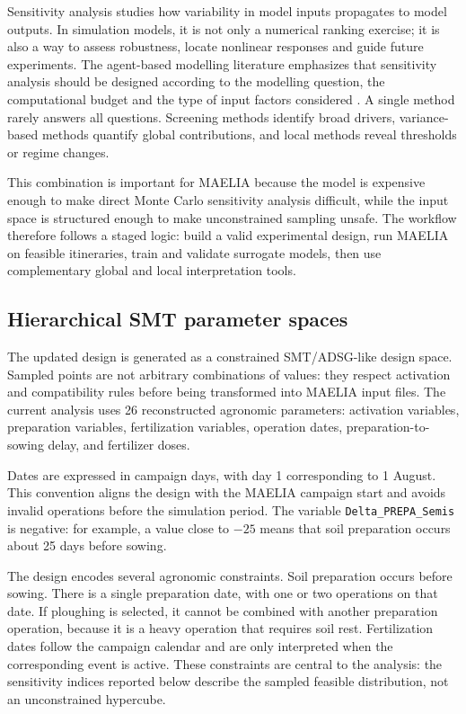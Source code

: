 \documentclass[11pt,a4paper]{article}
\newcommand{\param}[1]{\texttt{#1}}
\begin{document}
Sensitivity analysis studies how variability in model inputs propagates to model outputs. In simulation models, it is not only a numerical ranking exercise; it is also a way to assess robustness, locate nonlinear responses and guide future experiments. The agent-based modelling literature emphasizes that sensitivity analysis should be designed according to the modelling question, the computational budget and the type of input factors considered \citep{borgonovo2022protocol,tenbroeke2016which,thiele2014cookbook}. A single method rarely answers all questions. Screening methods identify broad drivers, variance-based methods quantify global contributions, and local methods reveal thresholds or regime changes.

This combination is important for MAELIA because the model is expensive enough to make direct Monte Carlo sensitivity analysis difficult, while the input space is structured enough to make unconstrained sampling unsafe. The workflow therefore follows a staged logic: build a valid experimental design, run MAELIA on feasible itineraries, train and validate surrogate models, then use complementary global and local interpretation tools.

\subsection{Hierarchical SMT parameter spaces}

The updated design is generated as a constrained SMT/ADSG-like design space. Sampled points are not arbitrary combinations of values: they respect activation and compatibility rules before being transformed into MAELIA input files. The current analysis uses 26 reconstructed agronomic parameters: activation variables, preparation variables, fertilization variables, operation dates, preparation-to-sowing delay, and fertilizer doses.

Dates are expressed in campaign days, with day 1 corresponding to 1 August. This convention aligns the design with the MAELIA campaign start and avoids invalid operations before the simulation period. The variable \param{Delta\_PREPA\_Semis} is negative: for example, a value close to $-25$ means that soil preparation occurs about 25 days before sowing.

The design encodes several agronomic constraints. Soil preparation occurs before sowing. There is a single preparation date, with one or two operations on that date. If ploughing is selected, it cannot be combined with another preparation operation, because it is a heavy operation that requires soil rest. Fertilization dates follow the campaign calendar and are only interpreted when the corresponding event is active. These constraints are central to the analysis: the sensitivity indices reported below describe the sampled feasible distribution, not an unconstrained hypercube.
\end{document}
